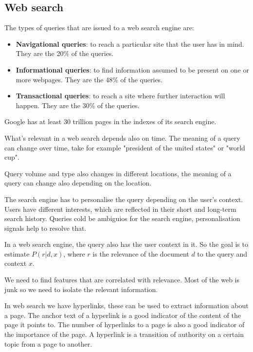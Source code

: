 \subsection{Web search}
\label{sec:web_search}

The types of queries that are issued to a web search engine
are:
\begin{itemize}
    \item \textbf{Navigational queries}: to reach a particular site
    that the user has in mind. They are the 20\% of the queries.
    \item \textbf{Informational queries}: to find information 
    assumed to be present on one or more webpages. They are
    the 48\% of the queries.
    \item \textbf{Transactional queries}: to reach a site where
    further interaction will happen. They are the 30\% of the
    queries.
\end{itemize}

Google has at least 30 trillion pages in the indexes of its search
engine.

What's relevant in a web search depends also on time. The meaning
of a query can change over time, take for example "president of
the united states" or "world cup".

Query volume and type also changes in different locations, the
meaning of a query can change also depending on the location.

The search engine has to personalise the query depending on the
user's context. Users have different interests, which are
reflected in their short and long-term search history.
Queries cold be ambiguios for the search engine, 
personalisation signals help to resolve that.

In a web search engine, the query also has the user context
in it.
So the goal is to estimate $P(r|d,x)$, where $r$ is the relevance
of the document $d$ to the query and context $x$.

We need to find features that are correlated with relevance.
Most of the web is junk so we need to isolate the relevant
information.

In web search we have hyperlinks, these can be used to extract
information about a page.
The anchor text of a hyperlink is a good indicator of the
content of the page it points to.
The number of hyperlinks to a page is also a good indicator
of the importance of the page.
A hyperlink is a transition of authority on a certain topic from
a page to another.

